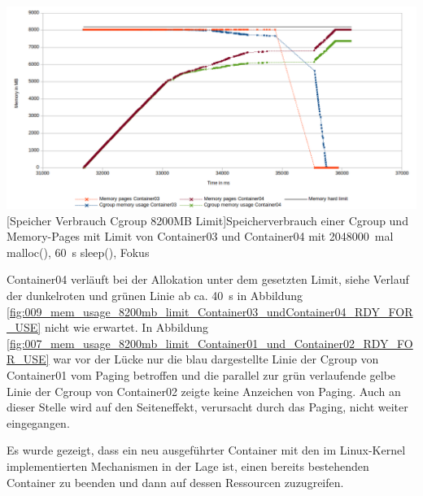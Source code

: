 \vspace{1em}
\begin{minipage}{\linewidth}
	\centering
	\includegraphics[width=1\linewidth]{pics/010_mem_usage_8200mb_limit_Container03_undContainer04_RDY_FOR_USE_Focus.png}
	[Speicher Verbrauch Cgroup 8200MB Limit]{Speicherverbrauch einer Cgroup und Memory-Pages mit Limit von Container03 und Container04 mit \SI{2048000}{mal} malloc(), \SI{60}{\second} sleep(), Fokus}
	\label{fig:010_mem_usage_8200mb_limit_Container03_undContainer04_RDY_FOR_USE_Focu}
\end{minipage}
\vspace{1em}

Container04 verläuft bei der Allokation unter dem gesetzten Limit, siehe Verlauf der dunkelroten und grünen Linie ab ca. \SI{40}{\second} in Abbildung \ref{fig:009_mem_usage_8200mb_limit_Container03_undContainer04_RDY_FOR_USE} nicht wie erwartet. In Abbildung \ref{fig:007_mem_usage_8200mb_limit_Container01_und_Container02_RDY_FOR_USE} war vor der Lücke nur die blau dargestellte Linie der Cgroup von Container01 vom Paging betroffen und die parallel zur grün verlaufende gelbe Linie der Cgroup von Container02 zeigte keine Anzeichen von Paging. Auch an dieser Stelle wird auf den Seiteneffekt, verursacht durch das Paging, nicht weiter eingegangen.

Es wurde gezeigt, dass ein neu ausgeführter Container mit den im Linux-Kernel implementierten Mechanismen in der Lage ist, einen bereits bestehenden Container zu beenden und dann auf dessen Ressourcen zuzugreifen.


